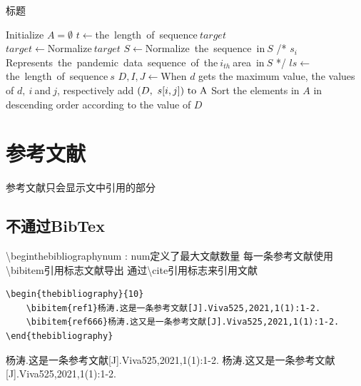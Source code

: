\documentclass{article}
\begin{document}
	\begin{algorithm}[htbp]{
	\caption{标题}
		\label{alg:mss}
		Initialize $A = \emptyset$\;
		$t \gets $the\ length\ of\ sequence$\ target$\;
		\leavevmode \\
		$target \gets $Normalize$\ target$\;
		$S \gets $Normalize\ the\ sequence\ in$\ S$\;
		/* $s_i\ $Represents\ the\ pandemic\ data\ sequence\ of\ the$\ i_{th}\ $area\ in$\ S$ */\;
		{
			$ls \gets $the\ length\ of\ sequence$\ s$\;
			{
			}
			$D,I,J \gets $When $d$ gets the maximum value, the values of $d,\ i\ $and$\ j$, respectively\;
			add $(D,\ s[i,j])\ \rm{to}\ A$\;
		}
		Sort the elements in $A$ in descending order according to the value of $D$\;
			\;
		}
	\end{algorithm}
	
	\section{参考文献}
	参考文献只会显示文中引用的部分
	
	\subsection{不通过BibTex}
	\textbackslash begin{thebibliography}{num} : num定义了最大文献数量
	每一条参考文献使用\textbackslash bibitem{引用标志}文献导出
	通过\textbackslash cite{引用标志}来引用文献\cite{ref666}
	\begin{lstlisting}
\begin{thebibliography}{10} 
	\bibitem{ref1}杨涛.这是一条参考文献[J].Viva525,2021,1(1):1-2.
	\bibitem{ref666}杨涛.这又是一条参考文献[J].Viva525,2021,1(1):1-2.
\end{thebibliography}
	\end{lstlisting}
	\begin{thebibliography}{10} 
		杨涛.这是一条参考文献[J].Viva525,2021,1(1):1-2.
		杨涛.这又是一条参考文献[J].Viva525,2021,1(1):1-2.
	\end{thebibliography}
\end{document}
